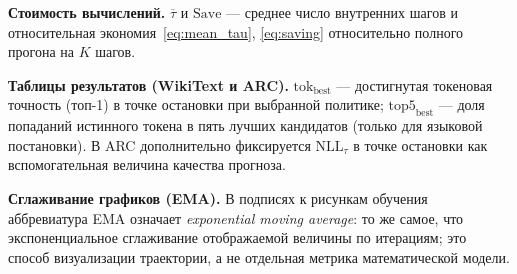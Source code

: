 \textbf{Стоимость вычислений.}
\(\overline\tau\) и \(\mathrm{Save}\) --- среднее число внутренних шагов и относительная
экономия~\eqref{eq:mean_tau}, \eqref{eq:saving} относительно полного прогона на \(K\) шагов.

\textbf{Таблицы результатов (WikiText и ARC).}
\(\mathrm{tok}_{\mathrm{best}}\) --- достигнутая токеновая точность (топ-1) в точке остановки при
выбранной политике; \(\mathrm{top5}_{\mathrm{best}}\) --- доля попаданий истинного токена в пять
лучших кандидатов (только для языковой постановки). В ARC дополнительно фиксируется
\(\mathrm{NLL}_\tau\) в точке остановки как вспомогательная величина качества прогноза.

\textbf{Сглаживание графиков (EMA).}
В подписях к рисункам обучения аббревиатура EMA означает \emph{exponential moving average}: то же
самое, что экспоненциальное сглаживание отображаемой величины по итерациям; это способ
визуализации траектории, а не отдельная метрика математической модели.